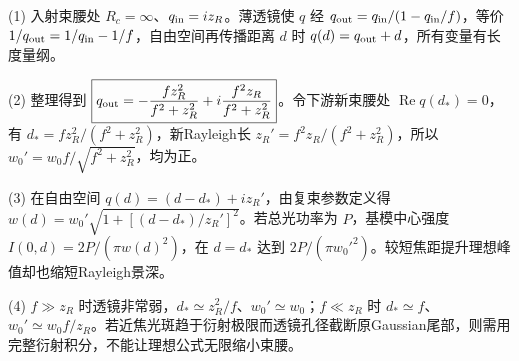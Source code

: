 (1) 入射束腰处 \(R_c=\infty\)、\(q_{\rm in}=iz_R\)。薄透镜使 \(q\) 经 \(q_{\rm out}=q_{\rm in}/(1-q_{\rm in}/f)\)，等价 \(1/q_{\rm out}=1/q_{\rm in}-1/f\)，自由空间再传播距离 \(d\) 时 \(q(d)=q_{\rm out}+d\)，所有变量有长度量纲。

(2) 整理得到 \(\boxed{q_{\rm out}=-\frac{fz_R^2}{f^2+z_R^2}+i\frac{f^2z_R}{f^2+z_R^2}}\)。令下游新束腰处 \(\operatorname{Re}q(d_*)=0\)，有 \(d_*=fz_R^2/(f^2+z_R^2)\)，新Rayleigh长 \(z_R'=f^2z_R/(f^2+z_R^2)\)，所以 \(w_0'=w_0f/\sqrt{f^2+z_R^2}\)，均为正。

(3) 在自由空间 \(q(d)=(d-d_*)+iz_R'\)，由复束参数定义得 \(w(d)=w_0'\sqrt{1+[(d-d_*)/z_R']^2}\)。若总光功率为 \(P\)，基模中心强度 \(I(0,d)=2P/(\pi w(d)^2)\)，在 \(d=d_*\) 达到 \(2P/(\pi w_0'^2)\)。较短焦距提升理想峰值却也缩短Rayleigh景深。

(4) \(f\gg z_R\) 时透镜非常弱，\(d_*\simeq z_R^2/f\)、\(w_0'\simeq w_0\)；\(f\ll z_R\) 时 \(d_*\simeq f\)、\(w_0'\simeq w_0 f/z_R\)。若近焦光斑趋于衍射极限而透镜孔径截断原Gaussian尾部，则需用完整衍射积分，不能让理想公式无限缩小束腰。
